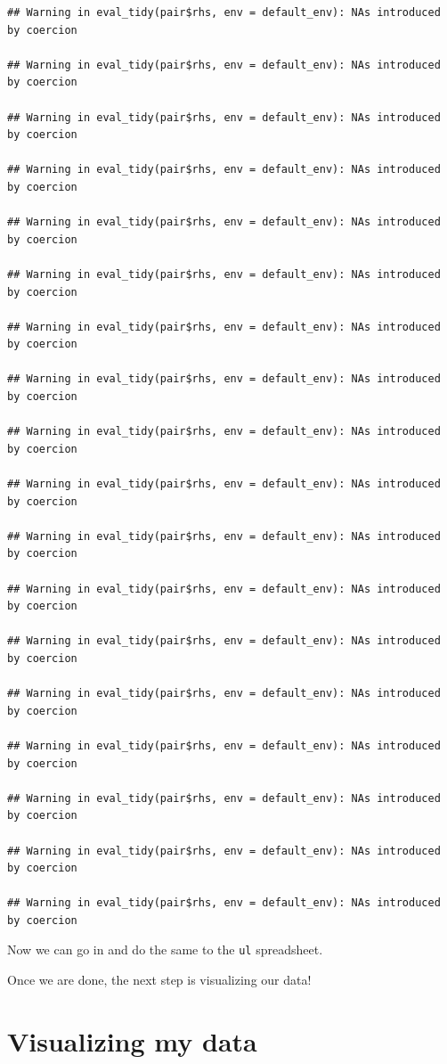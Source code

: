 \documentclass[
]{book}
\begin{document}
\begin{verbatim}
## Warning in eval_tidy(pair$rhs, env = default_env): NAs introduced by coercion

## Warning in eval_tidy(pair$rhs, env = default_env): NAs introduced by coercion

## Warning in eval_tidy(pair$rhs, env = default_env): NAs introduced by coercion

## Warning in eval_tidy(pair$rhs, env = default_env): NAs introduced by coercion

## Warning in eval_tidy(pair$rhs, env = default_env): NAs introduced by coercion

## Warning in eval_tidy(pair$rhs, env = default_env): NAs introduced by coercion

## Warning in eval_tidy(pair$rhs, env = default_env): NAs introduced by coercion

## Warning in eval_tidy(pair$rhs, env = default_env): NAs introduced by coercion

## Warning in eval_tidy(pair$rhs, env = default_env): NAs introduced by coercion

## Warning in eval_tidy(pair$rhs, env = default_env): NAs introduced by coercion

## Warning in eval_tidy(pair$rhs, env = default_env): NAs introduced by coercion

## Warning in eval_tidy(pair$rhs, env = default_env): NAs introduced by coercion

## Warning in eval_tidy(pair$rhs, env = default_env): NAs introduced by coercion

## Warning in eval_tidy(pair$rhs, env = default_env): NAs introduced by coercion

## Warning in eval_tidy(pair$rhs, env = default_env): NAs introduced by coercion

## Warning in eval_tidy(pair$rhs, env = default_env): NAs introduced by coercion

## Warning in eval_tidy(pair$rhs, env = default_env): NAs introduced by coercion

## Warning in eval_tidy(pair$rhs, env = default_env): NAs introduced by coercion
\end{verbatim}

Now we can go in and do the same to the \texttt{ul} spreadsheet.

Once we are done, the next step is visualizing our data!

\hypertarget{visualizing-my-data}{%
\chapter{Visualizing my data}\label{visualizing-my-data}}
\end{document}

